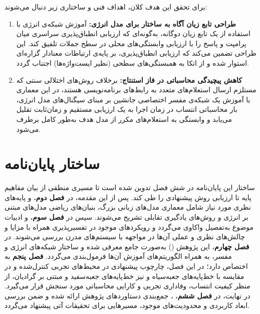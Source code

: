 برای تحقق این هدف کلان، اهداف فنی و ساختاری زیر دنبال می‌شوند:
\begin{enumerate}
    \item \textbf{طراحی تابع زیان آگاه به ساختار برای مدل انرژی:} آموزش شبکه‌ی انرژی با استفاده از یک تابع زیان دوگانه، به‌گونه‌ای که ارزیابی انطباق‌پذیری سراسری میان پرامپت و پاسخ را با ارزیابی وابستگی‌های محلی در سطح جملات تلفیق کند. این طراحی تضمین می‌کند که ارزیابی انطباق‌پذیری، بر پایه‌ی ارتباطات معنادار گزاره‌ای استوار شده و از اتکا به همبستگی‌های سطحی (نظیر ایست‌واژه‌ها) اجتناب گردد.
    
    \item \textbf{کاهش پیچیدگی محاسباتی در فاز استنتاج:} برخلاف روش‌های اختلالی سنتی که مستلزم ارسال استعلام‌های متعدد به رابط‌های برنامه‌نویسی هستند، در این معماری با آموزش یک شبکه‌ی مفسر اختصاصی جانشین بر مبنای سیگنال‌های مدل انرژی، بار محاسباتی انتساب در زمان اجرا به یک ارزیابی مستقیم و زمان‌ثابت تقلیل می‌یابد و وابستگی به استعلام‌های مکرر از مدل هدف به‌طور کامل برطرف می‌شود.
\end{enumerate}


\section{ساختار پایان‌نامه}\label{sec:1-6}

ساختار این پایان‌نامه در شش فصل تدوین شده است تا مسیری منطقی از بیان مفاهیم پایه تا ارزیابی روش پیشنهادی را طی کند. پس از این مقدمه، در \textbf{فصل دوم}،  و پایه‌های نظری مورد نیاز شامل معماری مدل‌های زبانی بزرگ، بنیان‌های ریاضی مدل‌های مبتنی بر انرژی و روش‌های یادگیری تقابلی تشریح می‌شوند. سپس در \textbf{فصل سوم}،  و ادبیات موضوع به‌تفصیل واکاوی می‌گردد و رویکردهای موجود در تفسیرپذیری همراه با مزایا و چالش‌های نظری و عملی آن‌ها در مواجهه با سیستم‌های مدرن بررسی می‌شوند. در \textbf{فصل چهارم}،  این پژوهش () به‌صورت جامع معرفی شده و ساختار شبکه‌های انرژی و مفسر، به همراه الگوریتم‌های آموزش آن‌ها فرمول‌بندی می‌گردد. \textbf{فصل پنجم} به  اختصاص دارد؛ در این فصل، چارچوب پیشنهادی در محیط‌های تجربی کنترل‌شده و در مقایسه با خط‌پایه‌های جعبه‌سیاه و نیز خط‌پایه‌های جعبه‌سفید و مبتنی بر گرادیان، از منظر کیفیت انتساب، وفاداری تجربی و کارایی محاسباتی مورد سنجش قرار می‌گیرد. در نهایت، در \textbf{فصل ششم}، ، جمع‌بندی دستاوردهای پژوهش ارائه شده و ضمن بررسی ابعاد کاربردی و محدودیت‌های موجود، مسیرهایی برای تحقیقات آتی پیشنهاد می‌گردد.
